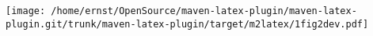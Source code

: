\documentclass[12pt]{article}
\begin{document}
 
\texttt{[image: /home/ernst/OpenSource/maven-latex-plugin/maven-latex-plugin.git/trunk/maven-latex-plugin/target/m2latex/1fig2dev.pdf]}%
\end{document}
